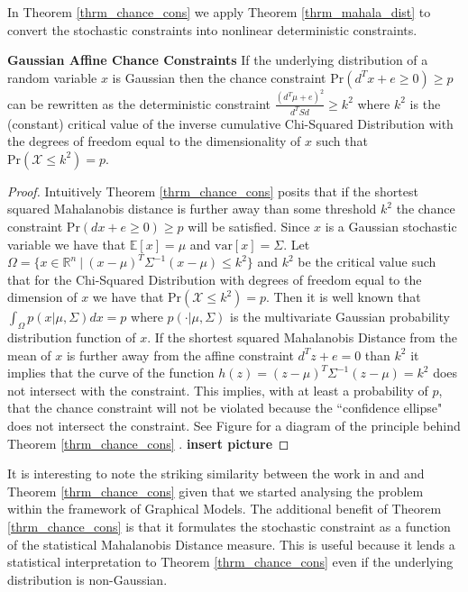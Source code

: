 In Theorem \ref{thrm_chance_cons} we apply Theorem \ref{thrm_mahala_dist} to convert the stochastic constraints into nonlinear deterministic constraints.
\begin{thrm}
\textbf{Gaussian Affine Chance Constraints} If the underlying distribution of a random variable $x$ is Gaussian then the chance constraint $\text{Pr}(d^Tx + e \geq 0) \geq p$ can be rewritten as the deterministic constraint $\frac{(d^T\mu+e)^2}{d^TSd} \geq k^2$ where $k^2$ is the (constant) critical value of the inverse cumulative Chi-Squared Distribution with the degrees of freedom equal to the dimensionality of $x$ such that $\text{Pr}(\mathcal{X} \leq k^2) = p$. 
\label{thrm_chance_cons}
\end{thrm}
\begin{proof}
Intuitively Theorem \ref{thrm_chance_cons} posits that if the shortest squared Mahalanobis distance is further away than some threshold $k^2$ the chance constraint $\text{Pr}(dx + e \geq 0) \geq p$ will be satisfied. Since $x$ is a Gaussian stochastic variable we have that $\mathbb{E}[x] =\mu$ and $\text{var}[x]=\Sigma$. Let $\Omega = \{x \in \mathbb{R}^n~|~(x-\mu)^T\Sigma^{-1}(x-\mu) \leq k^2\}$ and $k^2$ be the critical value such that for the Chi-Squared Distribution with degrees of freedom equal to the dimension of $x$ we have that $\text{Pr}(\mathcal{X} \leq k^2) = p$. Then it is well known \cite{mahala2} that $\int_{\Omega}p(x|\mu, \Sigma)dx = p$ where $p(\cdot|\mu, \Sigma)$ is the multivariate Gaussian probability distribution function of $x$. If the shortest squared Mahalanobis Distance from the mean of $x$ is further away from the affine constraint $d^Tz+e=0$ than $k^2$ it implies that the curve of the function $h(z) = (z-\mu)^T\Sigma^{-1}(z-\mu) = k^2$ does not intersect with the constraint. This implies, with at least a probability of $p$, that the chance constraint will not be violated because the ``confidence ellipse" does not intersect the constraint. See Figure for a diagram of the principle behind Theorem \ref{thrm_chance_cons} \cite{mahala1}. 
\textbf{insert picture}
\end{proof}
It is interesting to note the striking similarity between the work in \cite{vanhessem1} and \cite{vanhessem2} and Theorem \ref{thrm_chance_cons} given that we started analysing the problem within the framework of Graphical Models. The additional benefit of Theorem \ref{thrm_chance_cons} is that it formulates the stochastic constraint as a function of the statistical Mahalanobis Distance measure. This is useful because it lends a statistical interpretation to Theorem \ref{thrm_chance_cons} even if the underlying distribution is non-Gaussian.


